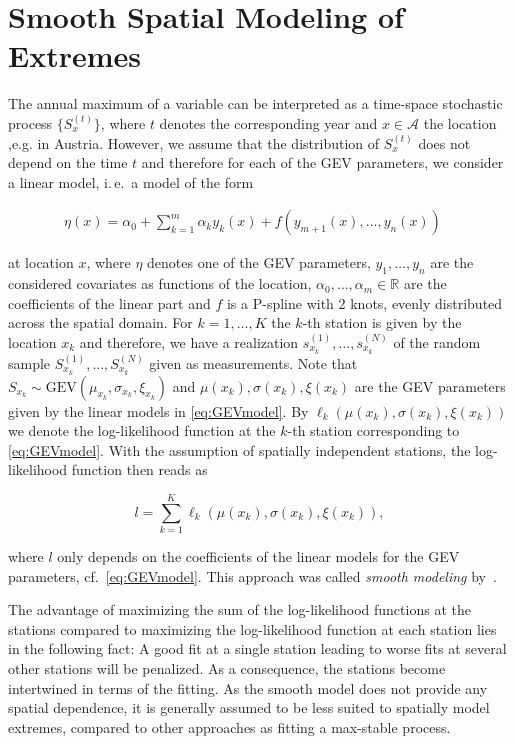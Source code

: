 \documentclass[a4paper,nojss]{jss}
\begin{document}
\section{Smooth Spatial Modeling of Extremes}
\label{sec:ssm}
The annual maximum of a variable can be interpreted as a time-space stochastic process $\{S_{x}^{(t)}\}$, where $t$ denotes the corresponding year and $x\in\mathcal{A}$ the location ,e.g. in Austria. However, we assume that the distribution of $S_x^{(t)}$ does not depend on the time $t$ and therefore for each of the GEV parameters, we consider a linear model, i.\,e.~a model of the form

\begin{align}\label{eq:GEVmodel}
\eta(x) = \alpha_0 + \sum_{k=1}^m \alpha_k y_k(x) + f\left(y_{m+1}(x),\ldots,y_{n}(x)\right)\quad
\end{align}

at location $x$, where $\eta$ denotes one of the GEV parameters, $y_1,\ldots,y_n$ are the considered covariates as functions of the location, $\alpha_0,\ldots,\alpha_m\in\mathbb{R}$ are the coefficients of the linear part and $f$ is a P-spline with 2 knots, evenly distributed across the spatial domain. For $k=1,\ldots,K$ the $k$-th station is given by the location $x_k$ and therefore, we have a realization $s_{x_k}^{(1)},\ldots,s_{x_k}^{(N)}$ of the random sample $S_{x_k}^{(1)},\ldots,S_{x_k}^{(N)}$ given as measurements. Note that $S_{x_k}\sim \text{GEV}(\mu_{x_k},\sigma_{x_k},\xi_{x_k})$ and $\mu(x_k),\sigma(x_k),\xi(x_k)$ are the GEV parameters given by the linear models in \eqref{eq:GEVmodel}. By $\ell_k\left(\mu(x_k),\sigma(x_k),\xi(x_k)\right)$ we denote the log-likelihood function at the $k$-th station corresponding to \eqref{eq:GEVmodel}. With the assumption of spatially independent stations, the log-likelihood function then reads as

\[
l = \sum_{k=1}^K \ell_k\left(\mu(x_k),\sigma(x_k),\xi(x_k)\right),
\]

where $l$ only depends on the coefficients of the linear models for the GEV parameters, cf.~\eqref{eq:GEVmodel}. This approach was called \emph{smooth modeling} by~\cite{BlanchetLehning2010}.

The advantage of maximizing the sum of the log-likelihood functions at the stations compared to maximizing the log-likelihood function at each station lies in the following fact: A good fit at a single station leading to worse fits at several other stations will be penalized. As a consequence, the stations become intertwined in terms of the fitting. As the smooth model does not provide any spatial dependence, it is generally assumed to be less suited to spatially model extremes, compared to other approaches as fitting a max-stable process. 
\end{document}
